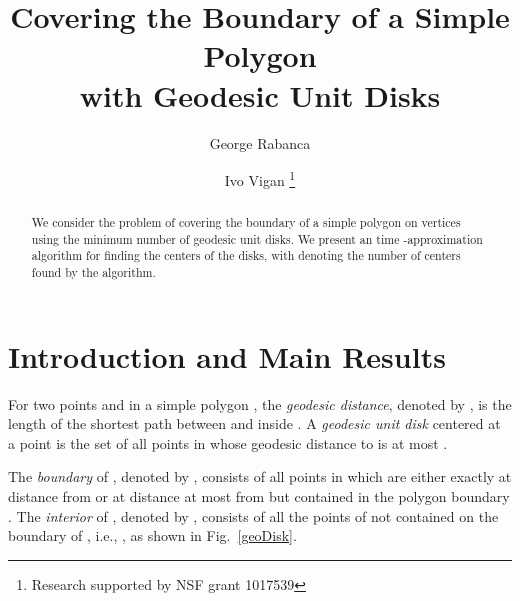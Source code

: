 \documentclass{llncs}
\title{Covering the Boundary of a Simple Polygon \\ with Geodesic Unit Disks}
\author{George Rabanca \and Ivo Vigan \thanks{Research supported by NSF grant 1017539}}
\institute{Department of Computer Science, City University of New York, \\The Graduate Center, New York, NY 10016, USA.}
\begin{document}
\maketitle



\begin{abstract}          
We consider the problem of covering the boundary of a simple polygon on  vertices using the minimum number of geodesic unit disks. We present an  time -approximation algorithm for finding the centers of the disks, with  denoting the number of centers found by the algorithm.

\end{abstract}

\section{Introduction and Main Results}










For two points  and  in a simple polygon , the \emph{geodesic distance}, denoted by , is the length of the shortest path between  and  inside . A \emph{geodesic unit disk}  centered at a point  is the set of all points in  whose geodesic distance to  is at most .

The \emph{boundary} of , denoted by , consists of all points in  which are either exactly at distance  from  or at distance at most  from  but contained in the polygon boundary . The \emph{interior} of , denoted by ,  consists of all the points of  not contained on the boundary of , i.e.,  ,  as shown in Fig.~\ref{geoDisk}. 
\end{document}
